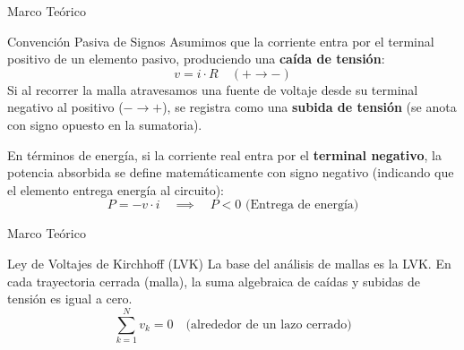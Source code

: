 \documentclass[10pt, aspectratio=169, handout]{beamer}
\begin{document}
\primeraDiapo


\begin{frame}{Marco Teórico}
    \begin{boxTeoria}{Convención Pasiva de Signos}
        Asumimos que la corriente entra por el terminal positivo de un elemento pasivo, produciendo una \textbf{caída de tensión}:
        \begin{equation*}
            v = i \cdot R \quad (+ \rightarrow -)
        \end{equation*}
        Si al recorrer la malla atravesamos una fuente de voltaje desde su terminal negativo al positivo ($- \rightarrow +$), se registra como una \textbf{subida de tensión} (se anota con signo opuesto en la sumatoria).

        \vspace{0.3cm}
        En términos de energía, si la corriente real entra por el \textbf{terminal negativo}, la potencia absorbida se define matemáticamente con signo negativo (indicando que el elemento entrega energía al circuito):
        \begin{equation*}
            P = -v \cdot i \quad \implies \quad P < 0 \text{ (Entrega de energía)}
        \end{equation*}
    \end{boxTeoria}
\end{frame}

\begin{frame}{Marco Teórico}
    \begin{boxTeoria}{Ley de Voltajes de Kirchhoff (LVK)}
        La base del análisis de mallas es la LVK. En cada trayectoria cerrada (malla), la suma algebraica de caídas y subidas de tensión es igual a cero.
        \begin{equation*}
            \sum_{k=1}^{N} v_k = 0 \quad \text{(alrededor de un lazo cerrado)}
        \end{equation*}
    \end{boxTeoria}
\end{frame}
\end{document}
